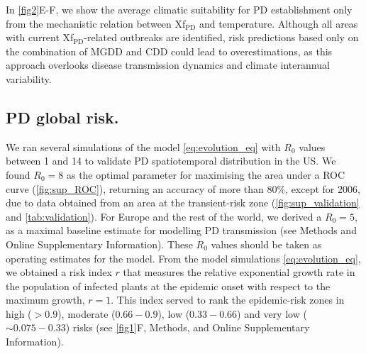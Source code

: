     In \cref{fig2}E-F, we show the average climatic suitability for PD
    establishment only from the mechanistic relation between Xf$_{\textrm{PD}}$
    and
    temperature. Although all areas with current Xf$_{\textrm{PD}}$-related
    outbreaks are identified, risk predictions based only on the combination of
    MGDD and CDD could lead to overestimations, as this approach overlooks
    disease
    transmission dynamics and climate interannual variability.

    \subsection{PD global risk.}
    We ran several simulations of the model \cref{eq:evolution_eq} with $R_0$
    values between 1 and 14 to validate PD spatiotemporal distribution in the
    US.
    We found $R_0=8$ as the optimal parameter for maximising the area under a
    ROC
    curve (\cref{fig:sup_ROC}), returning an accuracy of more than $80 \%$,
    except
    for 2006, due to data obtained from an area at the transient-risk zone
    (\cref{fig:sup_validation} and \cref{tab:validation}). For Europe and the
    rest
    of the world, we derived a $R_0=5$, as a maximal baseline estimate for
    modelling PD transmission (see Methods and Online Supplementary
    Information). These
$R_0$
    values should be taken as operating estimates for the model.  From the
    model
    simulations \cref{eq:evolution_eq}, we obtained a risk index $r$ that
    measures
    the relative exponential growth rate in the population of infected plants
    at
    the epidemic onset with respect to the maximum growth, $r=1$. This index
    served
    to rank the epidemic-risk zones in high ($> 0.9$), moderate ($0.66-0.9$),
    low
    ($0.33-0.66$) and very low ($\sim 0.075-0.33$) risks (see \cref{fig1}F,
    Methods, and Online Supplementary Information).

